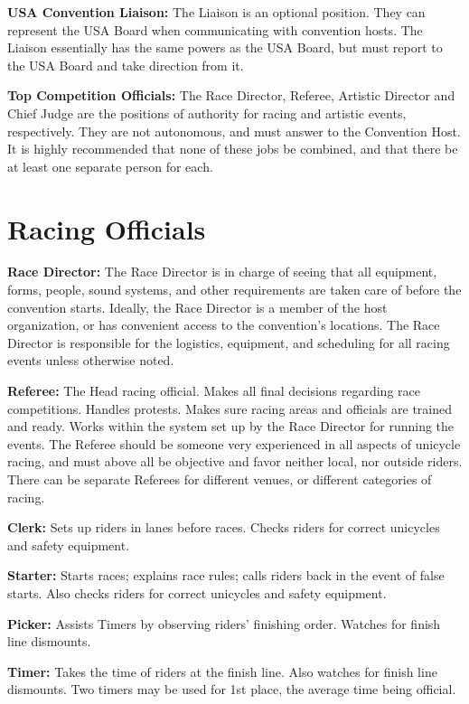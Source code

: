 \textbf{USA Convention Liaison:} The Liaison is an optional position. They can represent the USA Board when communicating with convention hosts.
The Liaison essentially has the same powers as the USA Board, but must report to the USA Board and take direction from it.

\textbf{Top Competition Officials:} The Race Director, Referee, Artistic Director and Chief Judge are the positions of authority for racing and artistic events, respectively.
They are not autonomous, and must answer to the Convention Host.
It is highly recommended that none of these jobs be combined, and that there be at least one separate person for each.

\section{Racing Officials}
\textbf{Race Director:} The Race Director is in charge of seeing that all equipment, forms, people, sound systems, and other requirements are taken care of before the convention starts.
Ideally, the Race Director is a member of the host organization, or has convenient access to the convention's locations.
The Race Director is responsible for the logistics, equipment, and scheduling for all racing events unless otherwise noted.

\textbf{Referee:} The Head racing official.
Makes all final decisions regarding race competitions.
Handles protests.
Makes sure racing areas and officials are trained and ready.
Works within the system set up by the Race Director for running the events.
The Referee should be someone very experienced in all aspects of unicycle racing, and must above all be objective and favor neither local, nor outside riders.
There can be separate Referees for different venues, or different categories of racing.

\textbf{Clerk:} Sets up riders in lanes before races.
Checks riders for correct unicycles and safety equipment.

\textbf{Starter:} Starts races; explains race rules; calls riders back in the event of false starts.
Also checks riders for correct unicycles and safety equipment.

\textbf{Picker:} Assists Timers by observing riders' finishing order.
Watches for finish line dismounts.

\textbf{Timer:} Takes the time of riders at the finish line.
Also watches for finish line dismounts.
Two timers may be used for 1st place, the average time being official.

